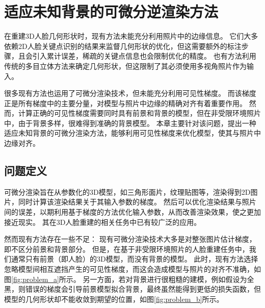 \chapter{适应未知背景的可微分逆渲染方法}
\label{chap:method}

在重建3D人脸几何形状时，现有方法未能充分利用照片中的边缘信息。
它们大多依赖2D人脸关键点识别的结果来监督几何形状的优化，但这需要额外的标注步骤，且会引入累计误差，稀疏的关键点信息也会限制优化的精度。
也有方法利用传统的多目立体方法来确定几何形状，但这限制了其必须使用多视角照片作为输入。

很多现有方法也运用了可微分渲染技术，但未能充分利用可见性梯度。
而该梯度正是所有梯度中的主要分量，对模型与照片中边缘的精确对齐有着重要作用。
然而，计算正确的可见性梯度需要同时具有前景和背景的模型，但在非受限环境照片中，由于背景多样，很难得到准确的背景模型。
本章主要针对该问题，提出一种适应未知背景的可微分渲染方法，能够利用可见性梯度来优化模型，使其与照片中边缘对齐。

\section{问题定义}

可微分渲染旨在从参数化的3D模型，如三角形面片，纹理贴图等，渲染得到2D图片，同时计算该渲染结果关于其输入参数的梯度。
然后可以优化渲染结果与照片间的误差，以期利用基于梯度的方法优化输入参数，从而改善渲染效果，使之更加接近现实。
其在3D人脸重建的相关任务中已有较广泛的应用。

然而现有方法存在一些不足：
现有可微分渲染技术大多是对整张图片估计梯度，即不区分前景和背景部分。
但是，在基于非受限环境照片的人脸重建任务中，我们通常只有前景（即人脸）的3D模型，而没有背景的模型。
此时，现有方法选择忽略模型间相互遮挡产生的可见性梯度，而这会造成模型与照片的对齐不准确，如图\ref{fig:problem_a}所示。
另一方面，若对背景进行很粗糙的建模，例如假设为全黑，则错误的梯度会引导前景模型拟合背景，最终虽然能得到更低的损失函数，但模型的几何形状却不能收敛到期望的位置，如图\ref{fig:problem_b}所示。

